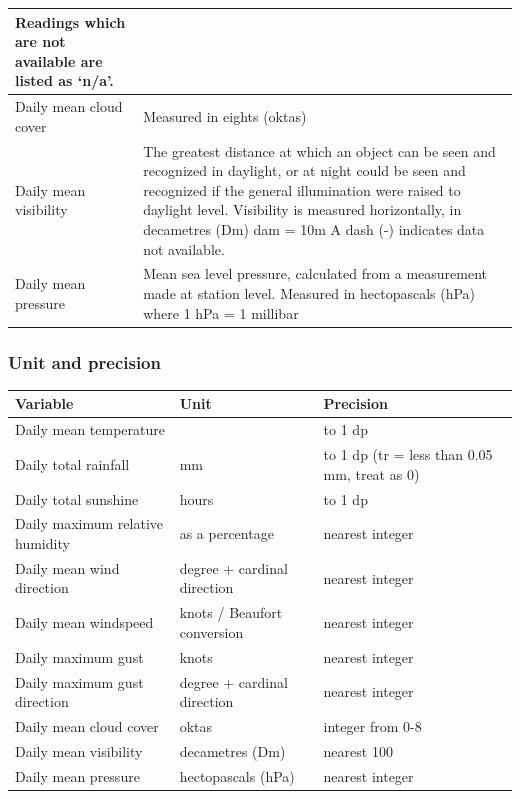 \documentclass[A4paper, 11pt]{article}
\begin{document}
\begin{tabular}{|p{5.5cm}|p{11.5cm}|}
		Readings which are not available are listed as ‘n/a’.  \\
		\hline
		Daily mean cloud cover & Measured in eights (oktas)   \\
		\hline
		Daily mean visibility & The greatest distance at which an object can be seen and recognized in daylight, or at night could be seen and recognized if the general illumination were raised to daylight level. 
		\newline Visibility is measured horizontally, in decametres (Dm) dam = 10m \newline A dash (-) indicates data not available.
		 \\
		\hline
		Daily mean pressure & Mean sea level pressure, calculated from a measurement made at station level. \newline Measured in hectopascals (hPa) 	where 1 hPa = 1 millibar
		  \\
		\hline
	\end{tabular}
	\subsubsection{Unit and precision}
	\begin{tabular}{|l|l|l|}
		\hline
		\textbf{Variable} & \textbf{Unit} & \textbf{Precision}\\
		\hline
		Daily mean temperature & \textcelsius & to 1 dp\\
		\hline
		Daily total rainfall & mm & to 1 dp (tr = less than 0.05 mm, treat as 0)\\
		\hline
		Daily total sunshine & hours & to 1 dp \\
		\hline
		Daily maximum relative humidity & as a percentage & nearest integer \\
		\hline
		Daily mean wind direction & degree + cardinal direction & nearest integer  \\
		\hline
		Daily mean windspeed & knots / Beaufort conversion & nearest integer \\
		\hline
		Daily maximum gust & knots & nearest integer   \\
		\hline
		Daily maximum gust direction & degree + cardinal direction & nearest integer   \\
		\hline
		Daily mean cloud cover & oktas  & integer from 0-8   \\
		\hline
		Daily mean visibility & decametres (Dm) & nearest 100  \\
		\hline
		Daily mean pressure & hectopascals (hPa) & nearest integer  \\
		\hline
	\end{tabular}
	
\end{document}
